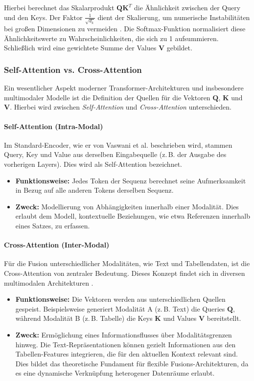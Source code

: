 Hierbei berechnet das Skalarprodukt $\mathbf{Q}\mathbf{K}^T$ die Ähnlichkeit zwischen der Query und den Keys. Der Faktor $\frac{1}{\sqrt{d_k}}$ dient der Skalierung, um numerische Instabilitäten bei großen Dimensionen zu vermeiden \cite{Vaswani2017}. Die Softmax-Funktion normalisiert diese Ähnlichkeitswerte zu Wahrscheinlichkeiten, die sich zu 1 aufsummieren. Schließlich wird eine gewichtete Summe der Values $\mathbf{V}$ gebildet.

\subsubsection{Self-Attention vs. Cross-Attention}

Ein wesentlicher Aspekt moderner Transformer-Architekturen und insbesondere multimodaler Modelle ist die Definition der Quellen für die Vektoren $\mathbf{Q}$, $\mathbf{K}$ und $\mathbf{V}$. Hierbei wird zwischen \textit{Self-Attention} und \textit{Cross-Attention} unterschieden.

\paragraph{Self-Attention (Intra-Modal)}
Im Standard-Encoder, wie er von Vaswani et al. \cite{Vaswani2017} beschrieben wird, stammen Query, Key und Value aus derselben Eingabequelle (z.\,B. der Ausgabe des vorherigen Layers). Dies wird als Self-Attention bezeichnet.
\begin{itemize}
    \item \textbf{Funktionsweise:} Jedes Token der Sequenz berechnet seine Aufmerksamkeit in Bezug auf alle anderen Tokens derselben Sequenz.
    \item \textbf{Zweck:} Modellierung von Abhängigkeiten innerhalb einer Modalität. Dies erlaubt dem Modell, kontextuelle Beziehungen, wie etwa Referenzen innerhalb eines Satzes, zu erfassen.
\end{itemize}

\paragraph{Cross-Attention (Inter-Modal)}
Für die Fusion unterschiedlicher Modalitäten, wie Text und Tabellendaten, ist die Cross-Attention von zentraler Bedeutung. Dieses Konzept findet sich in diversen multimodalen Architekturen \cite{Tan2019}.
\begin{itemize}
    \item \textbf{Funktionsweise:} Die Vektoren werden aus unterschiedlichen Quellen gespeist. Beispielsweise generiert Modalität A (z.\,B. Text) die Queries $\mathbf{Q}$, während Modalität B (z.\,B. Tabelle) die Keys $\mathbf{K}$ und Values $\mathbf{V}$ bereitstellt.
    \item \textbf{Zweck:} Ermöglichung eines Informationsflusses über Modalitätsgrenzen hinweg. Die Text-Repräsentationen können gezielt Informationen aus den Tabellen-Features integrieren, die für den aktuellen Kontext relevant sind. Dies bildet das theoretische Fundament für flexible Fusions-Architekturen, da es eine dynamische Verknüpfung heterogener Datenräume erlaubt.
\end{itemize}


